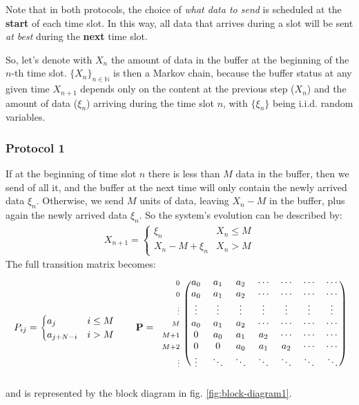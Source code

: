 \documentclass[../template.tex]{subfiles}
\begin{document}
Note that in both protocols, the choice of \textit{what data to send} is scheduled at the \textbf{start} of each time slot. In this way, all data that arrives during a slot will be sent \textit{at best} during the \textbf{next} time slot. 

\medskip

So, let's denote with $X_n$ the amount of data in the buffer at the beginning of the $n$-th time slot. $\{X_n\}_{n \in \mathbb{N}}$ is then a Markov chain, because the buffer status at any given time $X_{n+1}$ depends only on the content at the previous step ($X_n$) and the amount of data ($\xi_n$) arriving during the time slot $n$, with $\{\xi_n\}$ being i.i.d. random variables.

\subsubsection{Protocol 1}
If at the beginning of time slot $n$ there is less than $M$ data in the buffer, then we send of all it, and the buffer at the next time will only contain the newly arrived data $\xi_n$. Otherwise, we send $M$ units of data, leaving $X_n - M$ in the buffer, plus again the newly arrived data $\xi_n$. So the system's evolution can be described by:
\begin{align*}
    X_{n+1} = \begin{cases}
        \xi_n & X_n \leq M\\
        X_n - M + \xi_n & X_n > M
    \end{cases}
\end{align*}
The full transition matrix becomes:
\begin{align*}
    P_{ij} = \begin{cases}
        a_j & i \leq M\\
        a_{j+N-i} & i > M 
    \end{cases} \qquad
    \textbf{P} = \begin{blockarray}{>{\scriptstyle}r<{}(*{7}{c})}
            0 & a_0  & a_1  & a_2  & \cdots & \cdots & \cdots & \cdots \\ 
            0 & a_0  & a_1  & a_2  & \cdots & \cdots & \cdots & \cdots \\ 
            \vdots & \vdots & \vdots & \vdots & \vdots & \vdots & \vdots & \vdots \\ 
            M & a_0 & a_1 & a_2 & \cdots & \cdots & \cdots & \cdots \\ 
            M+1 & 0 & a_0 & a_1 & a_2 & \cdots & \cdots & \cdots \\ 
            M+2 & 0 & 0 & a_0 & a_1 & a_2 & \cdots & \cdots \\ 
            \vdots & \vdots & \ddots & \ddots & \ddots & \ddots & \ddots & \ddots
    \end{blockarray}
\end{align*}
and is represented by the block diagram in fig. \ref{fig:block-diagram1}.
\end{document}
